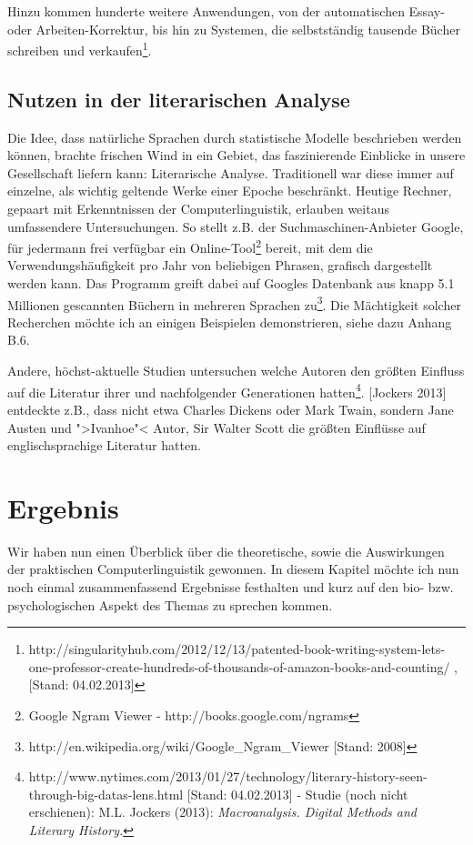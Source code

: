 \documentclass[12pt,a4paper]{article}
\theoremstyle{definition}
\begin{document}
		Hinzu kommen hunderte weitere Anwendungen, von der automatischen Essay- oder Arbeiten-Korrektur, bis hin zu Systemen, die selbstständig tausende Bücher schreiben und verkaufen\footnote{http://singularityhub.com/2012/12/13/patented-book-writing-system-lets-one-professor-create-hundreds-of-thousands-of-amazon-books-and-counting/ , [Stand: 04.02.2013]}.

	\subsection{Nutzen in der literarischen Analyse}
		Die Idee, dass natürliche Sprachen durch statistische Modelle beschrieben werden können, brachte frischen Wind in ein Gebiet, das faszinierende Einblicke in unsere Gesellschaft liefern kann: Literarische Analyse. Traditionell war diese immer auf einzelne, als wichtig geltende Werke einer Epoche beschränkt. Heutige Rechner, gepaart mit Erkenntnissen der Computerlinguistik, erlauben weitaus umfassendere Untersuchungen. So stellt z.B. der Suchmaschinen-Anbieter Google, für jedermann frei verfügbar ein Online-Tool\footnote{Google Ngram Viewer - http://books.google.com/ngrams} bereit, mit dem die Verwendungshäufigkeit pro Jahr von beliebigen Phrasen, grafisch dargestellt werden kann. Das Programm greift dabei auf Googles Datenbank aus knapp 5.1 Millionen gescannten Büchern in mehreren Sprachen zu\footnote{http://en.wikipedia.org/wiki/Google\_Ngram\_Viewer [Stand: 2008]}. Die Mächtigkeit solcher Recherchen möchte ich an einigen Beispielen demonstrieren, siehe dazu Anhang B.6.
	
		Andere, höchst-aktuelle Studien untersuchen welche Autoren den größten Einfluss auf die Literatur ihrer und nachfolgender Generationen hatten\footnote{http://www.nytimes.com/2013/01/27/technology/literary-history-seen-through-big-datas-lens.html [Stand: 04.02.2013] - Studie (noch nicht erschienen): M.L. Jockers (2013): \emph{Macroanalysis. Digital Methods and Literary History.}}. [Jockers 2013] entdeckte z.B., dass nicht etwa Charles Dickens oder Mark Twain, sondern Jane Austen und ">Ivanhoe"< Autor, Sir Walter Scott die größten Einflüsse auf englischsprachige Literatur hatten.

\section{Ergebnis}
	Wir haben nun einen Überblick über die theoretische, sowie die Auswirkungen der praktischen Computerlinguistik gewonnen.
	In diesem Kapitel möchte ich nun noch einmal zusammenfassend Ergebnisse festhalten und kurz auf den bio- bzw. psychologischen
	Aspekt des Themas zu sprechen kommen.
	
\end{document}
